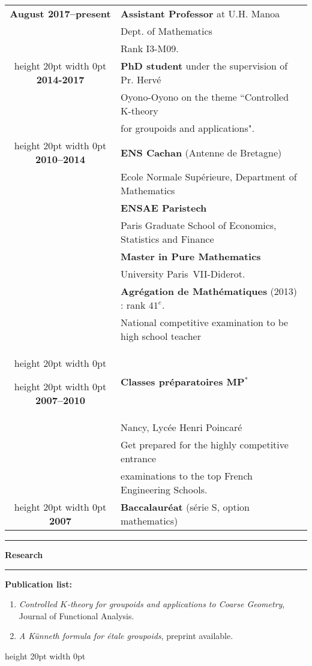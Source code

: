 \documentclass[a4paper,11pt]{article}
\newcommand\espace{\vrule height 20pt width 0pt}
\newcommand{\titre}[1]{%
	\begin{center}
	\bigskip
	\rule{\textwidth}{1pt}
	\par\vspace{0.1cm}
        \textbf{\large #1}
	\par\rule{\textwidth}{1pt}
	\end{center}
	\bigskip
	}
\begin{document}
\begin{tabular}{cp{}}

\textbf{August 2017--present} &  \textbf{Assistant Professor} at U.H. Manoa  \\
						& Dept. of Mathematics\\
						& Rank I3-M09. \\
\espace
\textbf{2014-2017} &  \textbf{PhD student} under the supervision of Pr. Hervé  \\
						& Oyono-Oyono on the theme ``Controlled K-theory \\
						& for groupoids and applications". \\
\espace
\textbf{2010--2014} &  \textbf{ENS Cachan} (Antenne de Bretagne) \\
				    & 	Ecole Normale Supérieure, Department of Mathematics \\
                              & \textbf{ENSAE Paristech}\\
				&	Paris Graduate School of Economics, Statistics and Finance\\
                                   & \textbf{Master in Pure Mathematics}\\  & University Paris~VII-Diderot. \\
                                   & \textbf{Agrégation de Mathématiques} (2013) : rank $41^e$. \\
				& National competitive examination to be high school teacher\\
\espace

\espace
\textbf{2007--2010} &\textbf{Classes préparatoires MP$^*$ } \\
					& Nancy, Lycée Henri Poincaré\\
					& Get prepared for the highly competitive entrance \\
				& examinations to the top French Engineering Schools.\\

\espace
\textbf{2007} & \textbf{Baccalauréat} (série S, option mathematics) 
 \\

\end{tabular}

\newpage
\titre{Research}

\textbf{Publication list:} 
\begin{enumerate}
\item \textit{Controlled $K$-theory for groupoids and applications to Coarse Geometry}, Journal of Functional Analysis. 
\item \textit{A K\"{u}nneth formula for \'etale groupoids}, preprint available.
\end{enumerate}
\espace
\end{document}

